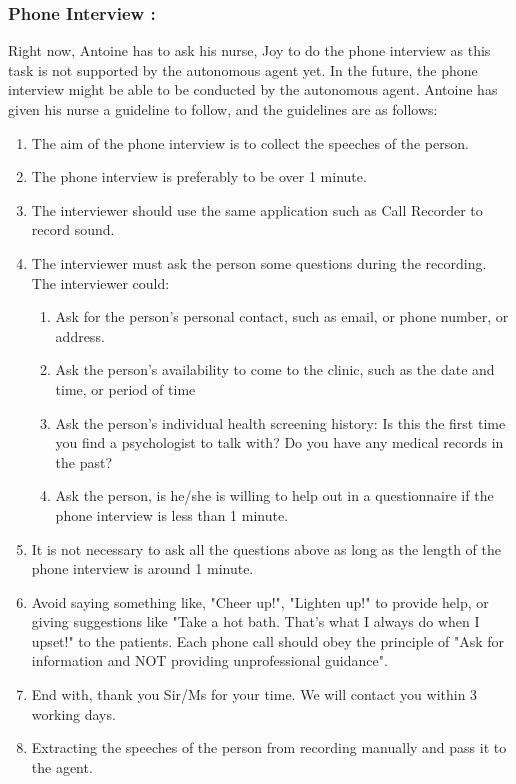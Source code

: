 \documentclass{article}
\begin{document}
	\subsubsection{Phone Interview :}
	Right now, Antoine has to ask his nurse, Joy to do the phone interview as this task is not supported by the autonomous agent yet. 
	In the future, the phone interview might be able to be conducted by the autonomous agent.
	Antoine has given his nurse a guideline to follow, and the guidelines are as follows:
	
   	\begin{enumerate}
    		\item The aim of the phone interview is to collect the speeches of the person.
    		\item The phone interview is preferably to be over 1 minute.
		\item The interviewer should use the same application such as Call Recorder to record sound.
		\item The interviewer must ask the person some questions during the recording. The interviewer could: 
          \begin{enumerate}
          	\item Ask for the person's personal contact, such as email, or phone number, or address.
          	\item Ask the person's availability to come to the clinic, such as the date and time, or period of time
          	\item Ask the person's individual health screening history: 
          	Is this the first time you find a psychologist to talk with? Do you have any medical records in the past?
          	\item Ask the person, is he/she is willing to help out in a questionnaire if the phone interview is less than 1 minute.
          \end{enumerate}
        \item It is not necessary to ask all the questions above as long as the length of the phone interview is around 1 minute.
        \item Avoid saying something like, "Cheer up!", "Lighten up!" to provide help, or giving suggestions like 
        		"Take a hot bath. That's what I always do when I upset!" to the patients. 
        		Each phone call should obey the principle of "Ask for information and NOT providing unprofessional guidance". \cite{PCS16}
        \item End with, thank you Sir/Ms for your time. We will contact you within 3 working days.
        \item Extracting the speeches of the person from recording manually and pass it to the agent.
	\end{enumerate}
\end{document}
